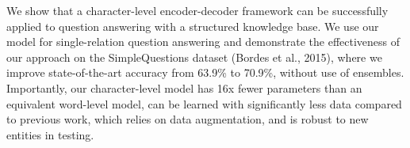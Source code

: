 We show that a character-level encoder-decoder framework can be successfully applied to question answering with a structured knowledge base. We use our model for single-relation  question answering and demonstrate the effectiveness of our approach on the SimpleQuestions dataset (Bordes et al., 2015), where we improve state-of-the-art accuracy from 63.9\% to 70.9\%, without use of ensembles. Importantly, our character-level model has 16x fewer parameters than an equivalent word-level model, can be learned with significantly less data compared to previous work, which relies on data augmentation, and is robust to new entities in testing.
